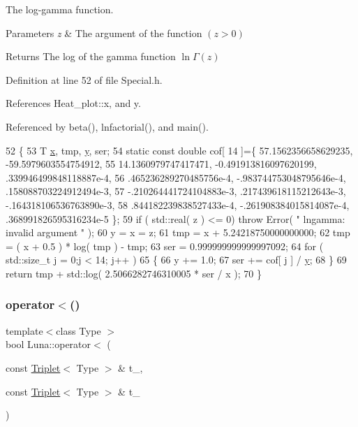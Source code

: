 The log-\/gamma function. 


\begin{DoxyParams}{Parameters}
{\em z} & The argument of the function $ (z > 0) $ \\
\hline
\end{DoxyParams}
\begin{DoxyReturn}{Returns}
The log of the gamma function $\ln \Gamma(z) $ 
\end{DoxyReturn}


Definition at line 52 of file Special.\+h.



References Heat\+\_\+plot\+::x, and y.



Referenced by beta(), lnfactorial(), and main().


\begin{DoxyCode}
52                           \{
53         T \hyperlink{namespaceHeat__plot_aa88370c16b85b784ccbde3ed88bc1991}{x}, tmp, \hyperlink{ODE__BVP__test_8cpp_adf764cbdea00d65edcd07bb9953ad2b7ae1f9fdb8b786c63efc4ce44eeacd17f2}{y}, ser;
54         \textcolor{keyword}{static} \textcolor{keyword}{const} \textcolor{keywordtype}{double} cof[ 14 ]=\{ 57.1562356658629235, -59.5979603554754912,
55         14.1360979747417471, -0.491913816097620199, .339946499848118887e-4,
56         .465236289270485756e-4, -.983744753048795646e-4, .158088703224912494e-3,
57         -.210264441724104883e-3, .217439618115212643e-3, -.164318106536763890e-3,
58         .844182239838527433e-4, -.261908384015814087e-4, .368991826595316234e-5 \};
59         \textcolor{keywordflow}{if} ( std::real( z ) <= 0) \textcolor{keywordflow}{throw} Error( \textcolor{stringliteral}{" lngamma: invalid argument "} );
60         y = x = z;
61         tmp = x + 5.24218750000000000;
62         tmp = ( x + 0.5 ) * log( tmp ) - tmp;
63         ser = 0.999999999999997092;
64         \textcolor{keywordflow}{for} ( std::size\_t j = 0;j < 14; j++ )
65       \{
66         y += 1.0;
67         ser += cof[ j ] / \hyperlink{ODE__BVP__test_8cpp_adf764cbdea00d65edcd07bb9953ad2b7ae1f9fdb8b786c63efc4ce44eeacd17f2}{y};
68       \}
69         \textcolor{keywordflow}{return} tmp + std::log( 2.5066282746310005 * ser / x );
70     \}
\end{DoxyCode}
\mbox{\label{namespaceLuna_a21985868e4570c7f9aa06566fa74e133}} 
\subsubsection{\texorpdfstring{operator$<$()}{operator<()}}
{\footnotesize\ttfamily template$<$class Type $>$ \\
bool Luna\+::operator$<$ (\begin{DoxyParamCaption}\item[{const \hyperlink{classLuna_1_1Triplet}{Triplet}$<$ Type $>$ \&}]{t\+\_,  }\item[{const \hyperlink{classLuna_1_1Triplet}{Triplet}$<$ Type $>$ \&}]{t\+\_ }\end{DoxyParamCaption})\hspace{0.3cm}{\ttfamily [inline]}}


